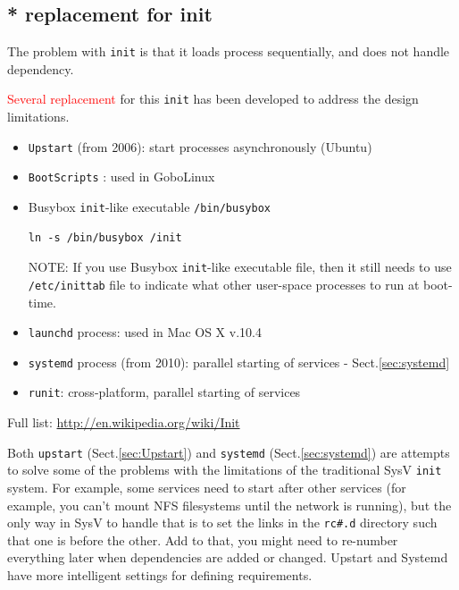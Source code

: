 % 


\subsection{* replacement for init}

The problem with \verb!init! is that it loads process sequentially, and does not
handle dependency. 

\textcolor{red}{Several replacement} for this \verb!init! has been developed to
address the design limitations. 
\begin{itemize}
  \item \verb!Upstart! (from 2006): start processes asynchronously (Ubuntu)
  
  \item \verb!BootScripts! : used in GoboLinux
  
  \item Busybox \verb!init!-like executable \verb!/bin/busybox!

\begin{verbatim}
ln -s /bin/busybox /init
\end{verbatim}  
NOTE: If you use Busybox \verb!init!-like executable file, then it still needs
to use \verb!/etc/inittab! file to indicate what other user-space processes to
run at boot-time.
  
  \item \verb!launchd! process: used in Mac OS X v.10.4
  
  \item \verb!systemd! process (from 2010): parallel starting of services -
  Sect.\ref{sec:systemd}
  
  \item \verb!runit!: cross-platform, parallel starting of services
  
\end{itemize}
Full list: \url{http://en.wikipedia.org/wiki/Init}

Both \verb!upstart! (Sect.\ref{sec:Upstart}) and \verb!systemd!
(Sect.\ref{sec:systemd}) are attempts to solve some of the problems with the
limitations of the traditional SysV \verb!init! system. For example, some
services need to start after other services (for example, you can't mount NFS
filesystems until the network is running), but the only way in SysV to handle
that is to set the links in the \verb!rc#.d! directory such that one is before
the other. Add to that, you might need to re-number everything later when
dependencies are added or changed. Upstart and Systemd have more intelligent
settings for defining requirements.

